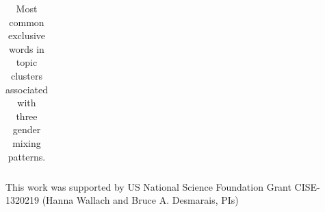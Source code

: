 \documentclass{pnastwo}
\begin{document}
\begin{article}
\begin{table}
\begin{tabular}{m{2.2in}|m{2.2in}|m{2.2in}}
 \\
		\bottomrule
	\end{tabular}
	\caption{\label{tab:top words for each pattern} Most common exclusive words in topic clusters associated with three gender mixing patterns.}
\end{table}


\begin{acknowledgments}
This work was supported by US National Science Foundation Grant CISE-1320219 (Hanna Wallach and Bruce A. Desmarais, PIs)
\vspace{-.5cm}
\end{acknowledgments}




\end{article}
\end{document}
